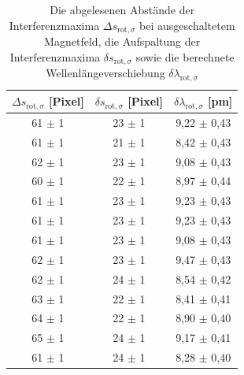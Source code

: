             \begin{table}[h]
                \centering
                \caption{Die abgelesenen Abstände der Interferenzmaxima $\Delta s_{\text{rot}, \sigma}$ bei ausgeschaltetem Magnetfeld, die Aufspaltung der Interferenzmaxima $\delta s_{\text{rot}, \sigma}$ sowie die berechnete Wellenlängeverschiebung $\delta \lambda_{\text{rot}, \sigma}$}
                \label{tab:rot_sigma}
              
                \begin{tabular}{c c c}
                  \toprule
                  {$\Delta s_{\text{rot}, \sigma}$ [Pixel]} & {$\delta s_{\text{rot}, \sigma}$ [Pixel]} & {$\delta \lambda_{\text{rot}, \sigma}$ [\si{\pico\metre}]} \\ 
                  \midrule
                   61 $\pm$ 1  &   23 $\pm$ 1   &   9,22 $\pm$ 0,43   \\
                   61 $\pm$ 1  &   21 $\pm$ 1   &   8,42 $\pm$ 0,43   \\
                   62 $\pm$ 1  &   23 $\pm$ 1   &   9,08 $\pm$ 0,43   \\
                   60 $\pm$ 1  &   22 $\pm$ 1   &   8,97 $\pm$ 0,44   \\
                   61 $\pm$ 1  &   23 $\pm$ 1   &   9,23 $\pm$ 0,43   \\
                   61 $\pm$ 1  &   23 $\pm$ 1   &   9,23 $\pm$ 0,43   \\
                   61 $\pm$ 1  &   23 $\pm$ 1   &   9,08 $\pm$ 0,43   \\
                   62 $\pm$ 1  &   23 $\pm$ 1   &   9,47 $\pm$ 0,43   \\
                   62 $\pm$ 1  &   24 $\pm$ 1   &   8,54 $\pm$ 0,42   \\
                   63 $\pm$ 1  &   22 $\pm$ 1   &   8,41 $\pm$ 0,41   \\
                   64 $\pm$ 1  &   22 $\pm$ 1   &   8,90 $\pm$ 0,40   \\
                   65 $\pm$ 1  &   24 $\pm$ 1   &   9,17 $\pm$ 0,41   \\
                   61 $\pm$ 1  &   24 $\pm$ 1   &   8,28 $\pm$ 0,40   \\

                  \bottomrule
                \end{tabular}
              \end{table}
              \FloatBarrier


